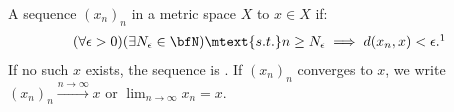     \begin{definition}\label{def:convergence}
        A sequence $(x_n)_n$ in a metric space $X$  to $x \in X$ if:
            \begin{equation*}
            \begin{split}
                (\forall \epsilon > 0)(\exists N_\epsilon \in \bfN) \mtext{s.t.} n \geq N_\epsilon \implies d(x_n,x) < \epsilon.\footnotemark
            \end{split}
            \end{equation*}
        If no such $x$ exists, the sequence is . If $(x_n)_n$ converges to $x$, we write $(x_n)_n \xrightarrow{n \rightarrow \infty} x$ or $\lim_{n \rightarrow \infty}x_n = x$.
    \end{definition}

